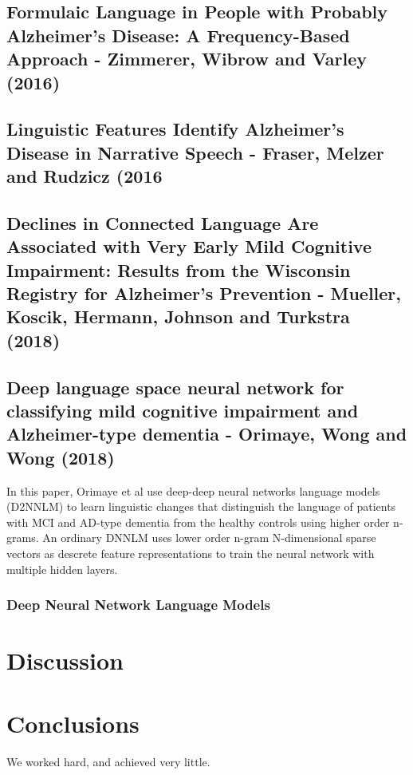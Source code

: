 \documentclass[12pt]{article}
\begin{document}
\subsection{Formulaic Language in People with Probably Alzheimer's Disease: A Frequency-Based Approach - Zimmerer, Wibrow and Varley (2016)}

\subsection{Linguistic Features Identify Alzheimer's Disease in Narrative Speech - Fraser, Melzer and Rudzicz (2016}

\subsection{Declines in Connected Language Are Associated with Very Early Mild Cognitive Impairment: Results from the Wisconsin Registry for Alzheimer's Prevention - Mueller, Koscik, Hermann, Johnson and Turkstra (2018)}

\subsection{Deep language space neural network for classifying mild cognitive impairment and Alzheimer-type dementia - Orimaye, Wong and Wong (2018)}
In this paper, Orimaye et al use deep-deep neural networks language models (D2NNLM) to learn linguistic changes that distinguish the language of patients with MCI and AD-type dementia from the healthy controls using higher order n-grams. An ordinary DNNLM uses lower order n-gram N-dimensional sparse vectors as descrete feature representations to train the neural network with multiple hidden layers.

\subsubsection{Deep Neural Network Language Models}

\section{Discussion}\label{discussion}

\section{Conclusions}\label{conclusions}
We worked hard, and achieved very little.





\end{document}
